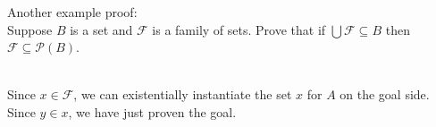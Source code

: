 \documentclass{article}
\begin{document}
\noindent Another example proof:\\
Suppose $B$ is a set and $\mathcal{F}$ is a family of sets. Prove that if $\bigcup \mathcal{F} \subseteq B$ then $\mathcal{F} \subseteq \mathcal{P}(B)$.\\
\\
Since $x \in \mathcal{F}$, we can existentially instantiate the set $x$ for $A$ on the goal side. Since $y \in x$, we have just proven the goal.\\
\end{document}
